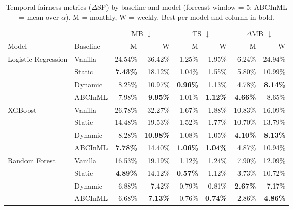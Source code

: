\begin{table}
  \small
  \caption{Temporal fairness metrics ($\Delta$SP) by baseline and model (forecast window = 5; ABCInML = mean over $\alpha$). M = monthly, W = weekly. Best per model and column in bold.}
  \label{tab:temporal-baselines-models}
  \begin{tabular}{llrrrrrr}
    \toprule
     & & \multicolumn{2}{c}{MB $\downarrow$} & \multicolumn{2}{c}{TS $\downarrow$} & \multicolumn{2}{c}{$\Delta$MB $\downarrow$} \\
    \cmidrule(lr){3-4} \cmidrule(lr){5-6} \cmidrule(lr){7-8}
    Model & Baseline & M & W & M & W & M & W \\
    \midrule
    Logistic Regression & Vanilla & 24.54\% & 36.42\% & 1.25\% & 1.95\% & 6.24\% & 24.94\% \\
     & Static & \textbf{7.43\%} & 18.12\% & 1.04\% & 1.55\% & 5.80\% & 10.99\% \\
     & Dynamic & 8.25\% & 10.97\% & \textbf{0.96\%} & 1.13\% & 4.78\% & \textbf{8.14\%} \\
     & ABCInML & 7.98\% & \textbf{9.95\%} & 1.01\% & \textbf{1.12\%} & \textbf{4.66\%} & 8.65\% \\
    \midrule
    XGBoost & Vanilla & 26.78\% & 32.27\% & 1.67\% & 1.88\% & 10.83\% & 16.09\% \\
     & Static & 14.48\% & 19.53\% & 1.52\% & 1.77\% & 10.70\% & 13.79\% \\
     & Dynamic & 8.28\% & \textbf{10.98\%} & 1.08\% & 1.05\% & \textbf{4.10\%} & \textbf{8.13\%} \\
     & ABCInML & \textbf{7.78\%} & 14.40\% & \textbf{1.06\%} & \textbf{1.04\%} & 4.87\% & 10.94\% \\
    \midrule
    Random Forest & Vanilla & 16.53\% & 19.19\% & 1.12\% & 1.24\% & 7.90\% & 12.09\% \\
     & Static & \textbf{4.89\%} & 14.12\% & \textbf{0.57\%} & 1.12\% & 3.73\% & 10.72\% \\
     & Dynamic & 6.88\% & 7.42\% & 0.79\% & 0.81\% & \textbf{2.67\%} & 7.17\% \\
     & ABCInML & 6.68\% & \textbf{7.13\%} & 0.76\% & \textbf{0.74\%} & 2.86\% & \textbf{4.86\%} \\
    \bottomrule
  \end{tabular}
\end{table}
